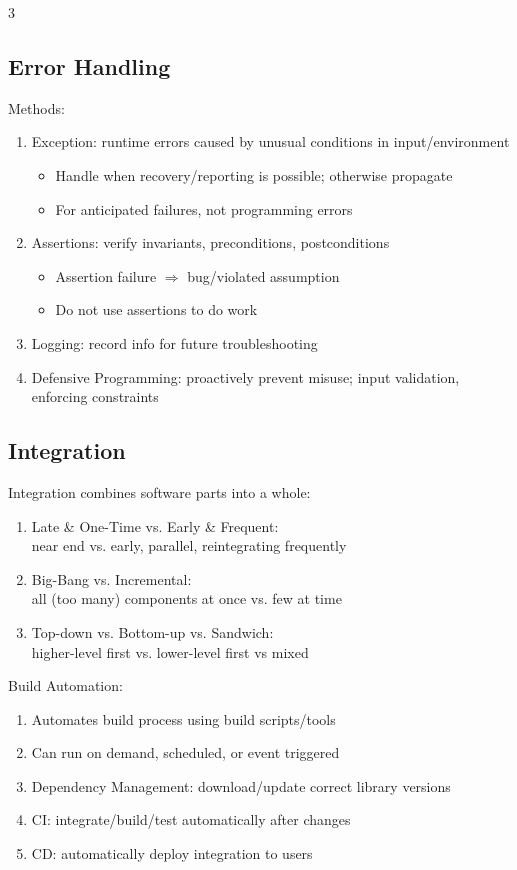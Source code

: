 \documentclass[12pt, a4paper]{article}
\begin{document}
\begin{multicols*}{3}
\subsection{Error Handling}
Methods:
\begin{enumerate}[\roman*.]
  \item Exception: runtime errors caused by unusual conditions in input/environment
    \begin{itemize}[leftmargin=*]\vspace{3pt}
      \item Handle when recovery/reporting is possible; otherwise propagate
      \item For anticipated failures, not programming errors
    \end{itemize}
  \item Assertions: verify invariants, preconditions, postconditions
    \begin{itemize}[leftmargin=*]\vspace{3pt}
      \item Assertion failure $\Rightarrow$ bug/violated assumption
      \item Do not use assertions to do work
    \end{itemize}
  \item Logging: record info for future troubleshooting
  \item Defensive Programming: proactively prevent misuse; input validation, enforcing constraints
\end{enumerate}

\colbreak
\subsection{Integration}
Integration combines software parts into a whole:
\begin{enumerate}[\roman*.]
  \item Late \& One-Time vs. Early \& Frequent:\\ near end vs. early, parallel, reintegrating frequently
  \item Big-Bang vs. Incremental:\\ all (too many) components at once vs. few at time
  \item Top-down vs. Bottom-up vs. Sandwich:\\higher-level first vs. lower-level first vs mixed
\end{enumerate}

Build Automation:
\begin{enumerate}[\roman*.]
  \item Automates build process using build scripts/tools
  \item Can run on demand, scheduled, or event triggered
  \item Dependency Management: download/update correct library versions
  \item CI: integrate/build/test automatically after changes
  \item CD: automatically deploy integration to users
\end{enumerate}


\end{multicols*}
\end{document}
